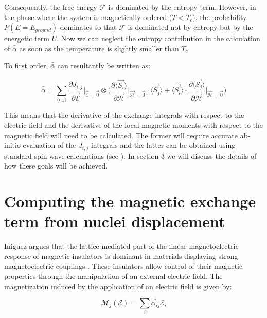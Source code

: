 \documentclass[10pt]{article}
\begin{document}
Consequently, the free energy $\mathcal{F}$ is dominated by the entropy term. However, in the phase where the system is magnetically ordered ($T < T_c$), the probability $P(E = E_{ground})$ dominates so that $\mathcal{F}$ is dominated not by entropy but by the energetic term $U$. Now we can neglect the entropy contribution in the calculation of $\bar{\bar{\alpha}}$ as soon as the temperature is slightly smaller than $T_c$.

To first order, $\bar{\bar{\alpha}}$ can resultantly be written as:

\begin{equation}
	\bar{\bar{\alpha}} = \sum_{\langle i,j \rangle} \frac{\partial J_{i,j}}{\partial \vec{\mathcal{E}}}\biggr\vert_{\vec{\mathcal{E}}=\vec{0}}\otimes\biggr(\frac{\partial \langle \vec{S_i}\rangle}{\partial \vec{\mathcal{H}}}\biggr\vert_{\vec{\mathcal{H}} = \vec{0}}\cdot\langle\vec{S_j}\rangle + \langle\vec{S_i}\rangle\cdot\frac{\partial \langle \vec{S_j}\rangle}{\partial\vec{\mathcal{H}}}\biggr\vert_{\vec{\mathcal{H}}=\vec{0}}\biggr)
\end{equation}

This means that the derivative of the exchange integrals with respect to the electric field and the derivative of the local magnetic moments with respect to the magnetic field will need to be calculated. The former will require accurate ab-initio evaluation of the $J_{i,j}$ integrals and the latter can be obtained using standard spin wave calculations (see \cite{anderson1951limits,kubo1952spin,oguchi1960theory}). In section 3 we will discuss the details of how these goals will be achieved.

\section{Computing the magnetic exchange term from nuclei displacement}

Iniguez argues that the lattice-mediated part of the linear magnetoelectric response of magnetic insulators is dominant in materials displaying strong magnetoelectric couplings \cite{iniguez2008first}. These insulators allow control of their magnetic properties through the manipulation of an external electric field. The magnetization induced by the application of an electric field is given by:

\begin{equation*}
\mathcal{M}_j(\mathcal{E}) = \sum_i \bar{\bar{\alpha_{ij}}}\mathcal{E}_i
\end{equation*}
\end{document}
